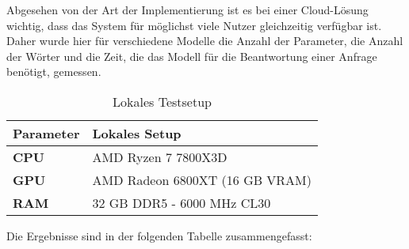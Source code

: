 \documentclass[german,report]{i1thesis}
\begin{document}
Abgesehen von der Art der Implementierung ist es bei einer Cloud-Lösung wichtig, dass das System für möglichst viele Nutzer gleichzeitig verfügbar ist.
Daher wurde hier für verschiedene Modelle die Anzahl der Parameter, die Anzahl der Wörter und die Zeit, die das Modell für die Beantwortung einer Anfrage benötigt, gemessen.\\


\begin{table}[H]
    \centering
    \begin{tabular}{|l|l|}
        \hline
        \textbf{Parameter} & \textbf{Lokales Setup}                 \\ \hline
        \textbf{\ac{CPU}}  & AMD Ryzen 7 7800X3D                    \\ \hline
        \textbf{\ac{GPU}}  & AMD Radeon 6800XT (16 GB \acs{VRAM})   \\ \hline
        \textbf{\ac{RAM}}  & 32 \acs{GB} DDR5 - 6000 \acs{MHz} CL30 \\ \hline
    \end{tabular}
    \caption{Lokales Testsetup}
\end{table}

Die Ergebnisse sind in der folgenden Tabelle zusammengefasst:\\
\end{document}
